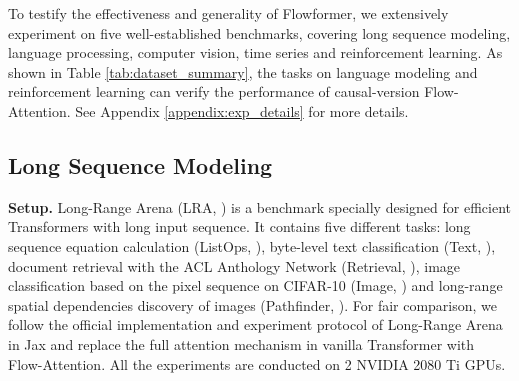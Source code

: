 \documentclass[nohyperref]{article}
\theoremstyle{plain}
\theoremstyle{definition}
\theoremstyle{remark}
\begin{document}
To testify the effectiveness and generality of Flowformer, we extensively experiment on five well-established benchmarks, covering long sequence modeling, language processing, computer vision, time series and reinforcement learning. As shown in Table \ref{tab:dataset_summary}, the tasks on language modeling and reinforcement learning can verify the performance of causal-version Flow-Attention. See Appendix \ref{appendix:exp_details} for more details.

\begin{table}[h]
    \vspace{-10pt}
	\caption{Summary of experiment benchmarks. }
	\label{tab:dataset_summary}
	\vskip 0.1in
	\centering
	\begin{small}
		\begin{sc}
			\renewcommand{\multirowsetup}{\centering}
			\setlength{\tabcolsep}{3.1pt}
		\end{sc}
	\end{small}
	\vspace{-5pt}
\end{table}

\subsection{Long Sequence Modeling}

\textbf{Setup.} Long-Range Arena (LRA, \citealt{Tay2021LongRA}) is a benchmark specially designed for efficient Transformers with long input sequence. It contains five different tasks: long sequence equation calculation (ListOps, \citealt{Nangia2018ListOpsAD}), byte-level text classification (Text, \citealt{Maas2011LearningWV}), document retrieval with the ACL Anthology Network (Retrieval, \citealt{Radev2013TheAA}), image classification based on the pixel sequence on CIFAR-10 (Image, \citealt{Krizhevsky2009LearningML}) and long-range spatial dependencies discovery of images (Pathfinder, \citealt{Linsley2018LearningLS}). For fair comparison, we follow the official implementation and experiment protocol of Long-Range Arena in Jax \cite{jax2018github} and replace the full attention mechanism in vanilla Transformer with Flow-Attention. All the experiments are conducted on 2 NVIDIA 2080 Ti GPUs.
\end{document}
